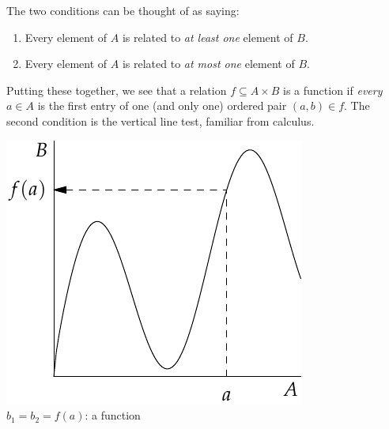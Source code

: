\noindent The two conditions can be thought of as saying:
\begin{enumerate}
  \item Every element of $A$ is related to \emph{at least one} element of $B$.
  \item Every element of $A$ is related to \emph{at most one} element of $B$.
\end{enumerate}
Putting these together, we see that a relation $f\subseteq A\times B$ is a function if \emph{every} $a\in A$ is the first entry of one (and only one) ordered pair $(a,b)\in f$. The second condition is the vertical line test, familiar from calculus.

\begin{center}
\begin{minipage}{0.32\textwidth}\centering
\includegraphics[width=\textwidth]{relations-05-funcvert}\\
$b_1=b_2=f(a)$: a function
\end{minipage}\qquad\qquad\qquad\qquad
\begin{minipage}{0.32\textwidth}\centering

\end{minipage}
\end{center}
